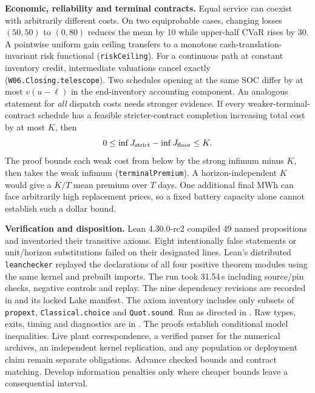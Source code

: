 \documentclass[10pt,letterpaper]{article}
\begin{document}
\textbf{Economic, reliability and terminal contracts.} Equal service can coexist with arbitrarily different costs. On two equiprobable cases, changing losses $(50,50)$ to $(0,80)$ reduces the mean by 10 while upper-half CVaR rises by 30. A pointwise uniform gain ceiling transfers to a monotone cash-translation-invariant risk functional (\texttt{riskCeiling}). For a continuous path at constant inventory credit, intermediate valuations cancel exactly (\texttt{W06.Closing.telescope}). Two schedules opening at the same SOC differ by at most $v(u-\ell)$ in the end-inventory accounting component. An analogous statement for \emph{all} dispatch costs needs stronger evidence. If every weaker-terminal-contract schedule has a feasible stricter-contract completion increasing total cost by at most $K$, then
\[
 0\leq \inf J_{\rm strict}-\inf J_{\rm floor}\leq K .
\]
The proof bounds each weak cost from below by the strong infimum minus $K$, then takes the weak infimum (\texttt{terminalPremium}). A horizon-independent $K$ would give a $K/T$ mean premium over $T$ days. One additional final MWh can face arbitrarily high replacement prices, so a fixed battery capacity alone cannot establish such a dollar bound.

\textbf{Verification and disposition.} Lean 4.30.0-rc2 compiled 49 named propositions and inventoried their transitive axioms. Eight intentionally false statements or unit/horizon substitutions failed on their designated lines. Lean's distributed \texttt{leanchecker} replayed the declarations of all four positive theorem modules using the same kernel and prebuilt imports. The run took 31.54\,s including source/pin checks, negative controls and replay. The nine dependency revisions are recorded in  and its locked Lake manifest. The axiom inventory includes only subsets of \texttt{propext}, \texttt{Classical.choice} and \texttt{Quot.sound}. Run  as directed in . Raw types, exits, timing and diagnostics are in . The proofs establish conditional model inequalities. Live plant correspondence, a verified parser for the numerical archives, an independent kernel replication, and any population or deployment claim remain separate obligations. Advance checked bounds and contract matching. Develop information penalties only where cheaper bounds leave a consequential interval.
\end{document}
